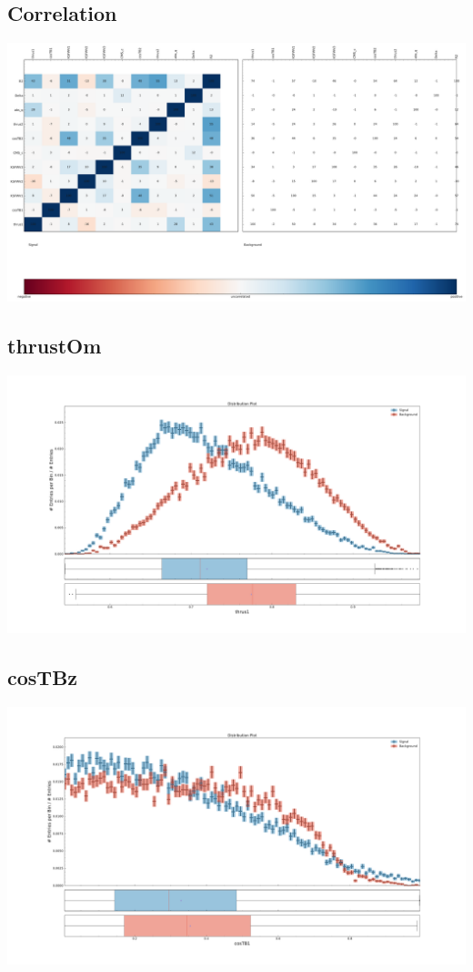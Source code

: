 \documentclass[10pt,a4paper]{article}
\begin{document}
\subsection{Correlation}
\begin{center}
\includegraphics[width=1.0\textwidth]{correlation_plot.pdf}
\end{center}
\subsection{thrustOm}
\begin{center}
\includegraphics[width=1.0\textwidth]{variable_-5041763317300029662.pdf}
\end{center}
\subsection{cosTBz}
\begin{center}
\includegraphics[width=1.0\textwidth]{variable_2763090154259738929.pdf}
\end{center}
\end{document}
